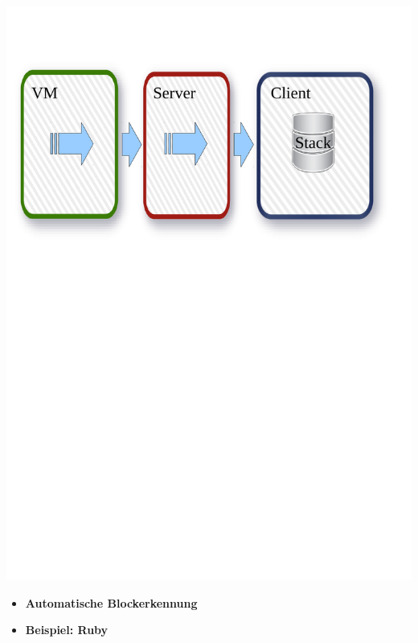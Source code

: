 \begin{frame}
	\begin{center}
		\includegraphics[scale=0.5]{scopes/stacks.pdf}
	\end{center}
\end{frame}

\begin{frame}
	\begin{itemize}
		\item[]\textbf{Automatische Blockerkennung} \\
		\item[]\textbf{Beispiel: Ruby} \\
	\end{itemize}
\end{frame}

